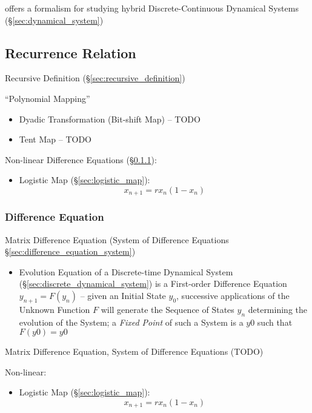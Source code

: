 offers a formalism for studying hybrid Discrete-Continuous Dynamical Systems
(\S\ref{sec:dynamical_system})



\subsection{Recurrence Relation}\label{sec:recurrence_relation}

Recursive Definition (\S\ref{sec:recursive_definition})

``Polynomial Mapping''

\begin{itemize}
  \item Dyadic Transformation (Bit-shift Map) -- TODO
  \item Tent Map -- TODO
\end{itemize}

Non-linear Difference Equations (\S\ref{sec:difference_equation}):
\begin{itemize}
  \item Logistic Map (\S\ref{sec:logistic_map}):\[
    x_{n+1} = rx_n(1-x_n)
  \]
\end{itemize}



\subsubsection{Difference Equation}\label{sec:difference_equation}

\fist Matrix Difference Equation (System of Difference Equations
\S\ref{sec:difference_equation_system})

\begin{itemize}
  \item Evolution Equation of a Discrete-time Dynamical System
    (\S\ref{sec:discrete_dynamical_system}) is a First-order Difference Equation
    $y_{n+1} = F(y_n)$ -- given an Initial State $y_0$, successive applications
    of the Unknown Function $F$ will generate the Sequence of States $y_n$
    determining the evolution of the System; a \emph{Fixed Point} of such a
    System is a $y0$ such that $F(y0) = y0$
\end{itemize}

Matrix Difference Equation, System of Difference Equations (TODO)

Non-linear:
\begin{itemize}
  \item Logistic Map (\S\ref{sec:logistic_map}):\[
    x_{n+1} = rx_n(1-x_n)
  \]
\end{itemize}



